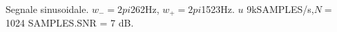 Segnale sinusoidale. $w_{-}=2pi$262Hz, $w_{+}=2pi$1523Hz. $
u$ 9kSAMPLES/s,$N=$ 1024 SAMPLES.SNR = 7 dB.